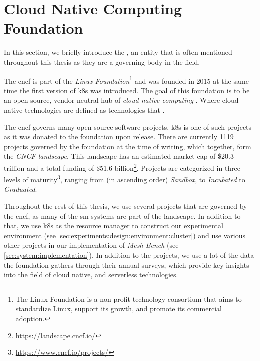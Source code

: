 \section{Cloud Native Computing Foundation}
\label{sec:background:cncf}


In this section, we briefly introduce the , an entity that is often mentioned throughout this thesis as they are a governing body in the field. 

The \gls{cncf} is part of the \textit{Linux Foundation}\footnote{The Linux Foundation  is a non-profit technology consortium that aims to standardize Linux, support its growth, and promote its commercial adoption.} and was founded in 2015 at the same time the first version of \gls{k8s} was introduced. The goal of this foundation is to be an open-source, vendor-neutral  hub of \textit{cloud native computing} \cite{cncf-charter}. Where cloud native technologies are defined as technologies that .

The \gls{cncf} governs many open-source software projects, \gls{k8s} is one of such projects as it was donated to the foundation upon release. There are currently 1119 projects governed by the foundation at the time of writing, which together, form the \textit{CNCF landscape}. This landscape has an estimated market cap of \$20.3 trillion and a total funding of \$51.6 billion\footnote{\url{https://landscape.cncf.io/}}. Projects are categorized in three levels of maturity\footnote{\url{https://www.cncf.io/projects/}}, ranging from (in ascending order) \textit{Sandbox}, to \textit{Incubated} to \textit{Graduated}.

Throughout the rest of this thesis, we use several projects that are governed by the \gls{cncf}, as many of the \gls{sm} systems are part of the landscape. In addition to that, we use \gls{k8s} as the resource manager to construct our experimental environment (see \cref{sec:experiments:design:environment:cluster}) and use various other projects in our implementation of \textit{Mesh Bench} (see \cref{sec:system:implementation}). In addition to the projects, we use a lot of the data the foundation gathers through their annual surveys, which provide key insights into the field of cloud native, and serverless technologies.
 